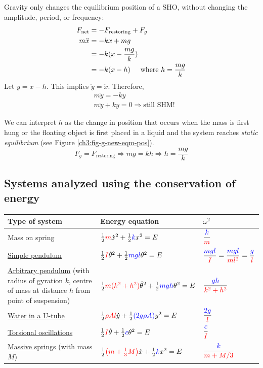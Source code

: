 Gravity only changes the equilibrium position of a SHO, without changing the amplitude, period, or frequency:
\begin{align*}
	F_\text{net} &= -F_\text{restoring} + F_g \\
	m\ddot{x} &= -kx + mg \\
	& = -k(x - \frac{mg}{k}) \\
	& = -k(x - h) \hspace{0.5cm}\text{where } h=\frac{mg}{k}
\end{align*}
Let $y=x-h$. This implies $\ddot{y} = \ddot{x}$. Therefore,
\begin{align*}
	&m\ddot{y} = -ky \\
	&m\ddot{y} + ky = 0  \Longrightarrow \text{still SHM!}
\end{align*}

We can interpret $h$ as the change in position that occurs when the mass is first hung or the floating object is first placed in a liquid and the system reaches \emph{static equilibrium} (see Figure \ref{ch3:fig-g-new-eqm-pos}).
\[ F_g = F_\text{restoring}\Longrightarrow mg = kh \Longrightarrow h = \frac{mg}{k} \]


\subsection{Systems analyzed using the conservation of energy}
\begin{center}
	\renewcommand{\arraystretch}{2.5}
	\begin{tabular}[t]{lll}
		\hline
		Type of system & Energy equation & $\omega^2$ \\ \hline
		Mass on spring &
			$\frac{1}{2}\textcolor{red}{m}\dot{x}^2 + \frac{1}{2}\textcolor{blue}{k}x^2 = E $ &
			$\dfrac{\textcolor{blue}{k}}{\textcolor{red}{m}}$
			\\
		\hyperref[ch3:sec-simple-pendulum]{Simple pendulum} &
			$\frac{1}{2}\textcolor{red}{I}\dot{\theta}^2 + \frac{1}{2}\textcolor{blue}{mgl}\theta^2 = E $ &
			$\dfrac{\textcolor{blue}{mgl}}{\textcolor{red}{I}} = \dfrac{\textcolor{blue}{mgl}}{\textcolor{red}{ml^2}}= \dfrac{\textcolor{blue}{g}}{\textcolor{red}{l}}$ 
			\\
		\parbox{5.5cm}{	\hyperref[ch3:sec-complex-pendulum]{Arbitrary pendulum} \footnotesize(with radius of gyration $k$, centre of mass at distance $h$ from point of suspension)}&
			$\frac{1}{2}\textcolor{red}{m(k^2+h^2)}\dot{\theta}^2 + \frac{1}{2}\textcolor{blue}{mgh}\theta^2 = E $ &
			$\dfrac{\textcolor{blue}{gh}}{\textcolor{red}{k^2+h^2}}$ 
			\\
		\hyperref[ch3:sec-uTube]{Water in a U-tube} &
			$\frac{1}{2}\textcolor{red}{\rho Al}\dot{y} + \frac{1}{2}\textcolor{blue}{(2g\rho A)}y^2 = E$ &
			$\dfrac{\textcolor{blue}{2g}}{\textcolor{red}{l}}$ 
			\\
		\hyperref[ch3:sec-torsional]{Torsional oscillations} &
			$\frac{1}{2}\textcolor{red}{I}\dot{\theta} + \frac{1}{2}\textcolor{blue}{c}\theta^2 = E$ &
			$\dfrac{\textcolor{blue}{c}}{\textcolor{red}{I}}$ 
			\\
		\parbox{5cm}{	\hyperref[ch3:sec-massive-springs]{Massive springs} \\\footnotesize{(with mass $M$)}} &
			$\frac{1}{2}\textcolor{red}{\left(m + \frac{1}{3}M \right)}\dot{x} + \frac{1}{2}\textcolor{blue}{k}x^2 = E$ &
			$\dfrac{\textcolor{blue}{k}}{\textcolor{red}{m + M/3}}$ 
			\\
		\hline
	\end{tabular}
	\renewcommand{\arraystretch}{1}
\end{center}



